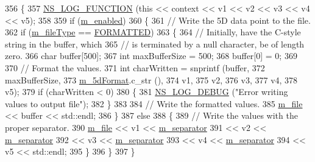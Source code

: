 \begin{DoxyCode}
356 \{
357   \hyperlink{log-macros-disabled_8h_a90b90d5bad1f39cb1b64923ea94c0761}{NS\_LOG\_FUNCTION} (\textcolor{keyword}{this} << context << v1 << v2 << v3 << v4 << v5);
358 
359   \textcolor{keywordflow}{if} (\hyperlink{classns3_1_1DataCollectionObject_a3e8b0578f03044b1db4811ecff2be7ea}{m\_enabled})
360     \{
361       \textcolor{comment}{// Write the 5D data point to the file.}
362       \textcolor{keywordflow}{if} (\hyperlink{classns3_1_1FileAggregator_aa2a8abfe3082a802dc6705e701f73e9e}{m\_fileType} == \hyperlink{classns3_1_1FileAggregator_aedb3108205a498f7ac0c564508067e2da7e34fea5d3f680d09518ee58ce4711f0}{FORMATTED})
363         \{
364           \textcolor{comment}{// Initially, have the C-style string in the buffer, which}
365           \textcolor{comment}{// is terminated by a null character, be of length zero.}
366           \textcolor{keywordtype}{char} buffer[500];
367           \textcolor{keywordtype}{int} maxBufferSize = 500;
368           buffer[0] = 0;
369 
370           \textcolor{comment}{// Format the values.}
371           \textcolor{keywordtype}{int} charWritten = snprintf (buffer,
372                                       maxBufferSize,
373                                       \hyperlink{classns3_1_1FileAggregator_a247f50a47e562ed81cb794e4615796f7}{m\_5dFormat}.c\_str (),
374                                       v1,
375                                       v2,
376                                       v3,
377                                       v4,
378                                       v5);
379           \textcolor{keywordflow}{if} (charWritten < 0)
380             \{
381               \hyperlink{group__logging_ga413f1886406d49f59a6a0a89b77b4d0a}{NS\_LOG\_DEBUG} (\textcolor{stringliteral}{"Error writing values to output file"});
382             \}
383 
384           \textcolor{comment}{// Write the formatted values.}
385           \hyperlink{classns3_1_1FileAggregator_a756affa0d614724be513ceedcff62ac0}{m\_file} << buffer << std::endl;
386         \}
387       \textcolor{keywordflow}{else}
388         \{
389           \textcolor{comment}{// Write the values with the proper separator.}
390           \hyperlink{classns3_1_1FileAggregator_a756affa0d614724be513ceedcff62ac0}{m\_file} << v1 << \hyperlink{classns3_1_1FileAggregator_a1f74a4c07f663d535da56dfb70414a15}{m\_separator}
391                  << v2 << \hyperlink{classns3_1_1FileAggregator_a1f74a4c07f663d535da56dfb70414a15}{m\_separator}
392                  << v3 << \hyperlink{classns3_1_1FileAggregator_a1f74a4c07f663d535da56dfb70414a15}{m\_separator}
393                  << v4 << \hyperlink{classns3_1_1FileAggregator_a1f74a4c07f663d535da56dfb70414a15}{m\_separator}
394                  << v5 << std::endl;
395         \}
396     \}
397 \}
\end{DoxyCode}
